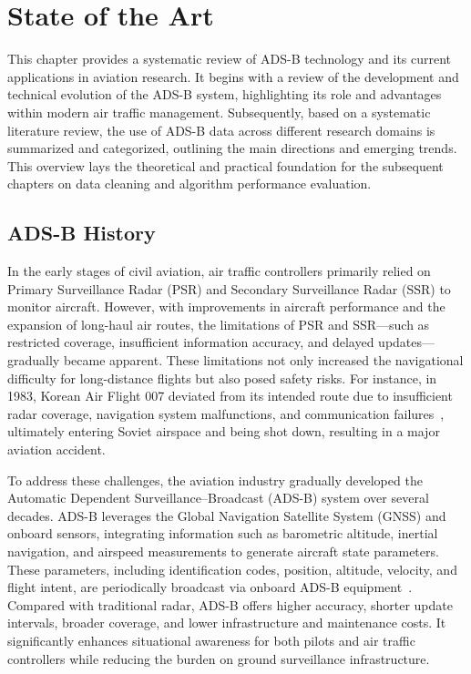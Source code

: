 \section{State of the Art}\label{soa}

This chapter provides a systematic review of ADS-B technology and its current applications in aviation research. It begins with a review of the development and technical evolution of the ADS-B system, highlighting its role and advantages within modern air traffic management. Subsequently, based on a systematic literature review, the use of ADS-B data across different research domains is summarized and categorized, outlining the main directions and emerging trends. This overview lays the theoretical and practical foundation for the subsequent chapters on data cleaning and algorithm performance evaluation.


\subsection{ADS-B History}
In the early stages of civil aviation, air traffic controllers primarily relied on Primary Surveillance Radar (PSR) and Secondary Surveillance Radar (SSR) to monitor aircraft. However, with improvements in aircraft performance and the expansion of long-haul air routes, the limitations of PSR and SSR—such as restricted coverage, insufficient information accuracy, and delayed updates—gradually became apparent. These limitations not only increased the navigational difficulty for long-distance flights but also posed safety risks. For instance, in 1983, Korean Air Flight 007 deviated from its intended route due to insufficient radar coverage, navigation system malfunctions, and communication failures~\cite{icao_1993}, ultimately entering Soviet airspace and being shot down, resulting in a major aviation accident.

To address these challenges, the aviation industry gradually developed the Automatic Dependent Surveillance–Broadcast (ADS-B) system over several decades. ADS-B leverages the Global Navigation Satellite System (GNSS) and onboard sensors, integrating information such as barometric altitude, inertial navigation, and airspeed measurements to generate aircraft state parameters. These parameters, including identification codes, position, altitude, velocity, and flight intent, are periodically broadcast via onboard ADS-B equipment~\cite{olive2024filtering}. Compared with traditional radar, ADS-B offers higher accuracy, shorter update intervals, broader coverage, and lower infrastructure and maintenance costs. It significantly enhances situational awareness for both pilots and air traffic controllers while reducing the burden on ground surveillance infrastructure.

